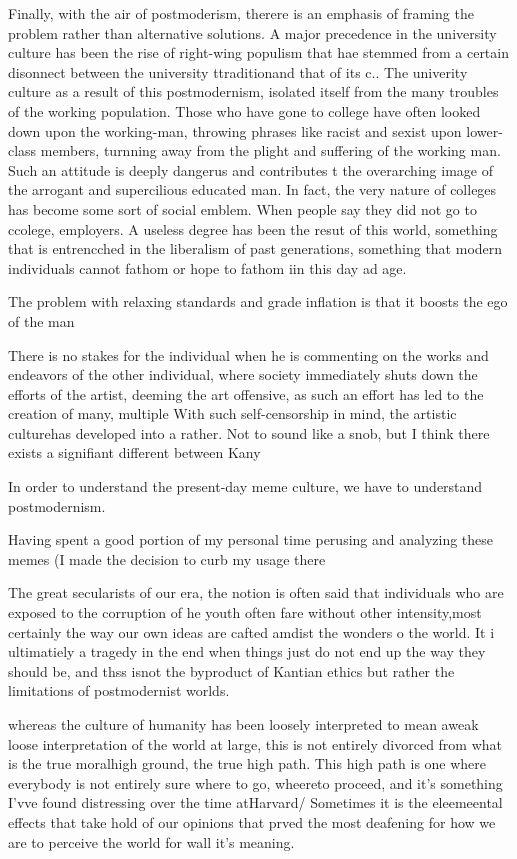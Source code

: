 \documentclass[12pt,letterpaper]{article}
\begin{document}
Finally, with the air of postmoderism, therere is an emphasis of framing the problem rather than alternative solutions.  A major precedence in the university culture has been the rise of right-wing populism that hae stemmed from a certain disonnect between the university ttraditionand that of its c..  The univerity culture as a result of this postmodernism, isolated itself from the many troubles of the working population.  Those who have gone to college have often looked down upon the working-man, throwing phrases like racist and sexist upon lower-class members, turnning away from the plight and suffering of the working man.  Such an attitude is deeply dangerus and contributes t the overarching image of the arrogant and supercilious educated man.  In fact, the very nature of colleges has become some sort of social emblem.  When people say they did not go to ccolege, employers.  A useless degree has been the resut of this world, something that is entrencched in the liberalism of past generations, something that modern individuals cannot fathom or hope to fathom iin this day ad age.

The problem with relaxing standards  and grade inflation is that it boosts the ego of the man


There is no stakes for the individual when he is commenting on the works and endeavors of the other individual, where society immediately shuts down the efforts of the artist, deeming the art offensive, as such an effort has led to the creation of many, multiple 
With such self-censorship in mind, the artistic culturehas developed into a rather.  Not to sound like a snob, but I think there exists a signifiant different between Kany



In order to understand the present-day meme culture, we have to understand postmodernism.


Having spent a good portion of my personal time perusing and analyzing these memes (I made the decision to curb my usage there

The great secularists of our era, the notion is often said that individuals  who are exposed to the corruption of he youth often fare without other intensity,most certainly the way our own ideas are cafted amdist the wonders o the world.  It i ultimatiely a tragedy in the end when things just do not end up the way they should be, and thss isnot the byproduct of Kantian ethics but rather the limitations  of postmodernist worlds.

whereas  the culture of humanity has been loosely interpreted to mean aweak loose  interpretation of the world at large, this is not entirely divorced from what is the true  moralhigh ground, the true high path.  This high path is one where everybody is not entirely sure where to go, wheereto proceed,  and it's something I'vve found distressing over the time atHarvard/  Sometimes it is the eleemeental effects that take hold of our opinions that  prved the most deafening for how we are to perceive  the world for wall it's meaning.
\end{document}

